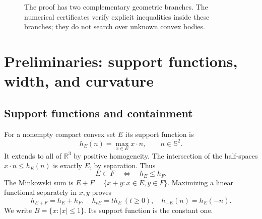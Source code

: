 \documentclass[11pt]{article}
\numberwithin{equation}{section}
\theoremstyle{definition}\newtheorem{definition}[theorem]{Definition}
\theoremstyle{remark}\newtheorem{remark}[theorem]{Remark}
\newcommand{\R}{\mathbb R}
\newcommand{\Sph}{\mathbb S^2}
\newcommand{\Vol}{\operatorname{Vol}}
\begin{document}
\begin{figure}[ht]
\centering
{}
\caption{The proof has two complementary geometric branches. The numerical
certificates verify explicit inequalities inside these branches; they do not
search over unknown convex bodies.}\label{fig:roadmap}
\end{figure}

\section{Preliminaries: support functions, width, and curvature}\label{sec:prelim}
\subsection{Support functions and containment}
For a nonempty compact convex set $E$ its support function is
\[
 h_E(n)=\max_{x\in E}x\cdot n,\qquad n\in\Sph.
\]
It extends to all of $\R^3$ by positive homogeneity. The intersection of the
half-spaces $x\cdot n\le h_E(n)$ is exactly $E$, by separation. Thus
\begin{equation}\label{eq:supportorder}
 E\subset F\quad\Longleftrightarrow\quad h_E\le h_F.
\end{equation}
The Minkowski sum is $E+F=\{x+y:x\in E,y\in F\}$. Maximizing a linear
functional separately in $x,y$ proves
\[
 h_{E+F}=h_E+h_F,\quad h_{tE}=t h_E\ (t\ge0),\quad h_{-E}(n)=h_E(-n).
\]
We write $B=\{x:|x|\le1\}$. Its support function is the constant one.
\end{document}
